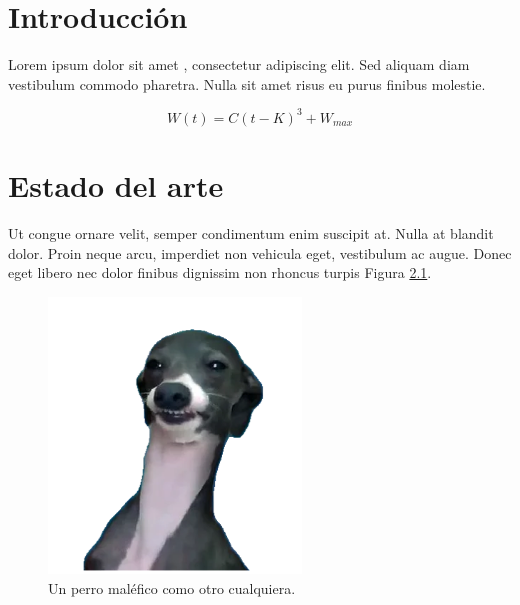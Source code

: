 






\chapter{Introducción}

Lorem ipsum dolor sit amet \cite{robomind-web}, consectetur adipiscing elit. Sed aliquam diam vestibulum commodo pharetra. Nulla sit amet risus eu purus finibus molestie.

\begin{equation}
W(t) = C(t-K)^{3} + W_{max}
\end{equation}


\chapter{Estado del arte}
Ut congue ornare velit, semper condimentum enim suscipit at. Nulla at blandit dolor. Proin neque arcu, imperdiet non vehicula eget, vestibulum ac augue. Donec eget libero nec dolor finibus dignissim non rhoncus turpis Figura \ref{fig:evil-dog}.

\begin{figure}[!ht]
	\begin{centering}
		\includegraphics[width=0.6\textwidth]{images/evil-dog.png}
			\caption{Un perro maléfico como otro cualquiera.}
				\label{fig:evil-dog}
	\end{centering}
\end{figure}



